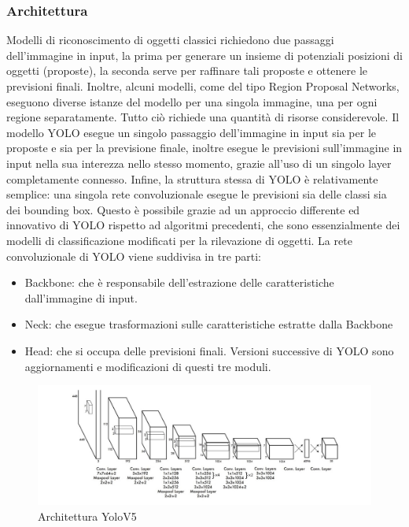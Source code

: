 \documentclass{article}
\begin{document}
    \subsubsection{Architettura}
    \cite{yolotutorial}  \cite{yoloarch}
    Modelli di riconoscimento di oggetti classici richiedono due passaggi dell'immagine in input, la prima per generare un insieme di potenziali posizioni di oggetti (proposte), la seconda serve per raffinare tali proposte e ottenere le previsioni finali.
    Inoltre, alcuni modelli, come del tipo Region Proposal Networks, eseguono diverse istanze del modello per una singola immagine, una per ogni regione separatamente. Tutto ciò richiede una quantità di risorse considerevole.
    Il modello YOLO esegue un singolo passaggio dell'immagine in input sia per le proposte e sia per la previsione finale, inoltre esegue le previsioni sull'immagine in input nella sua interezza nello stesso momento, grazie all'uso di un singolo layer completamente connesso. 
    Infine, la struttura stessa di YOLO è relativamente semplice: una singola rete convoluzionale esegue le previsioni sia delle classi sia dei bounding box. Questo è possibile grazie ad un approccio differente ed innovativo di YOLO rispetto ad algoritmi precedenti, che sono essenzialmente dei modelli di classificazione modificati per la rilevazione di oggetti.
    La rete convoluzionale di YOLO viene suddivisa in tre parti: 
    \begin{itemize}
        \item Backbone: che è responsabile dell'estrazione delle caratteristiche dall'immagine di input.
        \item Neck: che esegue trasformazioni sulle caratteristiche estratte dalla Backbone
        \item Head: che si occupa delle previsioni finali.
    Versioni successive di YOLO sono aggiornamenti e modificazioni di questi tre moduli.
    \end{itemize}
    
\begin{figure}[h!]
    \centering
    \includegraphics[width=1.1\linewidth]{img/architetttura_yolo.jpg}
    \caption{Architettura YoloV5}
\end{figure}
\end{document}
